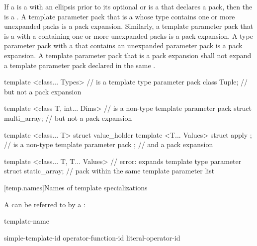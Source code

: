\pnum
If a  is a
 with an ellipsis prior to its
optional  or is a
 that declares a
pack, then the 
is a .
A template parameter pack that is a  whose type
contains one or more unexpanded packs is a pack expansion. Similarly,
a template parameter pack that is a  with a
 containing one or more unexpanded
packs is a pack expansion.
A type parameter pack with a  that
contains an unexpanded parameter pack is a pack expansion.
A template parameter pack that is a pack
expansion shall not expand a template parameter pack declared in the same
.
\begin{example}
\begin{codeblock}
template <class... Types>                       //  is a template type parameter pack
   class Tuple;                                 // but not a pack expansion

template <class T, int... Dims>                 //  is a non-type template parameter pack
   struct multi_array;                          // but not a pack expansion

template <class... T>
  struct value_holder {
    template <T... Values> struct apply { };    //  is a non-type template parameter pack
  };                                            // and a pack expansion

template <class... T, T... Values>              // error:  expands template type parameter
  struct static_array;                          // pack  within the same template parameter list
\end{codeblock}
\end{example}

[temp.names]{Names of template specializations}

\pnum
A  can be referred to by a
:

\begin{bnf}
\br
  template-name \terminal{<}  \terminal{>}
\end{bnf}

\begin{bnf}
\br
  simple-template-id\br
  operator-function-id \terminal{<}  \terminal{>}\br
  literal-operator-id \terminal{<}  \terminal{>}
\end{bnf}

